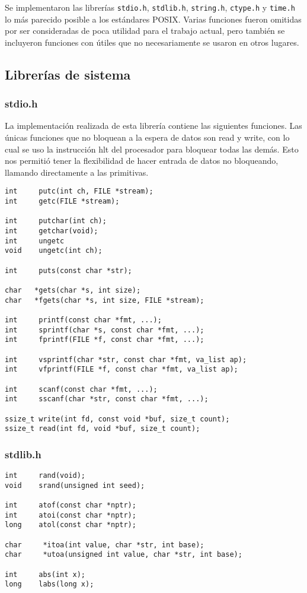 \documentclass[11pt]{article}
\begin{document}
Se implementaron las librerías \texttt{stdio.h}, \texttt{stdlib.h}, \texttt{string.h}, \texttt{ctype.h} y \texttt{time.h} lo más parecido posible a los estándares POSIX. Varias funciones fueron omitidas por ser consideradas de poca utilidad para el trabajo actual, pero también se incluyeron funciones con útiles que no necesariamente se usaron en otros lugares.

\subsection{Librerías de sistema}

\subsubsection{stdio.h}
La implementación realizada de esta librería contiene las siguientes funciones. Las únicas funciones que no bloquean a la espera de datos son read y write, con lo cual se uso la instrucción hlt del procesador para bloquear todas las demás. Esto nos permitió tener la flexibilidad de hacer entrada de datos no bloqueando, llamando directamente a las primitivas.

\begin{lstlisting}
int     putc(int ch, FILE *stream);
int     getc(FILE *stream);

int     putchar(int ch);
int     getchar(void);
int     ungetc
void    ungetc(int ch);

int     puts(const char *str);

char   *gets(char *s, int size);
char   *fgets(char *s, int size, FILE *stream);

int     printf(const char *fmt, ...);
int     sprintf(char *s, const char *fmt, ...);
int     fprintf(FILE *f, const char *fmt, ...);

int     vsprintf(char *str, const char *fmt, va_list ap);
int     vfprintf(FILE *f, const char *fmt, va_list ap);

int     scanf(const char *fmt, ...);
int     sscanf(char *str, const char *fmt, ...);

ssize_t write(int fd, const void *buf, size_t count);
ssize_t read(int fd, void *buf, size_t count);
\end{lstlisting}

\subsubsection{stdlib.h}

\begin{lstlisting}
int     rand(void);
void    srand(unsigned int seed);

int     atof(const char *nptr);
int     atoi(const char *nptr);
long    atol(const char *nptr);

char     *itoa(int value, char *str, int base);
char     *utoa(unsigned int value, char *str, int base);

int     abs(int x);
long    labs(long x);
\end{lstlisting}
\end{document}

